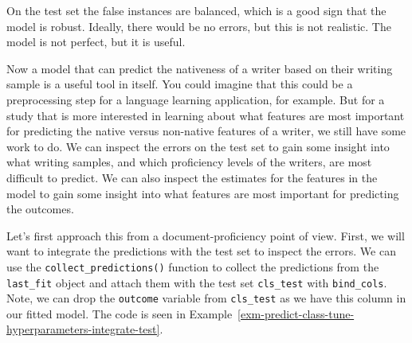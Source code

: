 \documentclass[
  letterpaper,
  krantz1]{latex/krantz-mod}
\theoremstyle{definition}
\theoremstyle{definition}
\theoremstyle{remark}
\begin{document}
On the test set the false instances are balanced, which is a good sign
that the model is robust. Ideally, there would be no errors, but this is
not realistic. The model is not perfect, but it is useful.

Now a model that can predict the nativeness of a writer based on their
writing sample is a useful tool in itself. You could imagine that this
could be a preprocessing step for a language learning application, for
example. But for a study that is more interested in learning about what
features are most important for predicting the native versus non-native
features of a writer, we still have some work to do. We can inspect the
errors on the test set to gain some insight into what writing samples,
and which proficiency levels of the writers, are most difficult to
predict. We can also inspect the estimates for the features in the model
to gain some insight into what features are most important for
predicting the outcomes.

Let's first approach this from a document-proficiency point of view.
First, we will want to integrate the predictions with the test set to
inspect the errors. We can use the \texttt{collect\_predictions()}
function to collect the predictions from the \texttt{last\_fit} object
and attach them with the test set \texttt{cls\_test} with
\texttt{bind\_cols}. Note, we can drop the \texttt{outcome} variable
from \texttt{cls\_test} as we have this column in our fitted model. The
code is seen in
Example~\ref{exm-predict-class-tune-hyperparameters-integrate-test}.
\end{document}
